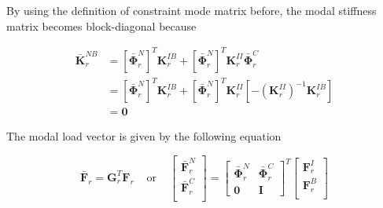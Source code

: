 \documentclass[../DomainDecomposition.tex]{subfiles}
\begin{document}
\newpage
By using the definition of constraint mode matrix before, the modal stiffness matrix becomes block-diagonal because 

\begin{equation*}
    \begin{aligned}
        \bar{\mathbf{K}}_{r}^{NB} 
        &= 
        \left[\bar{\mathbf{\Phi}}_{r}^{N} \right]^{T} \mathbf{K}_{r}^{IB} + 
        \left[\bar{\mathbf{\Phi}}_{r}^{N} \right]^{T} \mathbf{K}_{r}^{II} 
              \bar{\mathbf{\Phi}}_{r}^{C} \\
        &=
        \left[\bar{\mathbf{\Phi}}_{r}^{N} \right]^{T} \mathbf{K}_{r}^{IB} + 
        \left[\bar{\mathbf{\Phi}}_{r}^{N} \right]^{T} \mathbf{K}_{r}^{II} 
            \left[
                -\left(\mathbf{K}_{r}^{II}\right)^{-1} 
                \mathbf{K}_{r}^{IB} 
            \right] \\
        &= 
        \mathbf{0} 
    \end{aligned}
\end{equation*}

The modal load vector is given by the following equation

\begin{equation}
    \bar{\mathbf{F}}_{r} 
    =
    \mathbf{G}_{r}^{T} \mathbf{F}_{r} 
    \phantom{xx} 
    \text{or} 
    \phantom{xx} 
    \begin{bmatrix}
        \bar{\mathbf{F}}_{r}^{N} \\
        \bar{\mathbf{F}}_{r}^{C} \\
    \end{bmatrix}
    =
    \begin{bmatrix}
        \bar{\mathbf{\Phi}}_{r}^{N} &
        \bar{\mathbf{\Phi}}_{r}^{C} \\ 
        \mathbf{0} & 
        \mathbf{I} 
    \end{bmatrix}^{T} 
    \begin{bmatrix}
        \mathbf{F}_{r}^{I} \\
        \mathbf{F}_{r}^{B} \\
    \end{bmatrix}
\end{equation}
\end{document}
